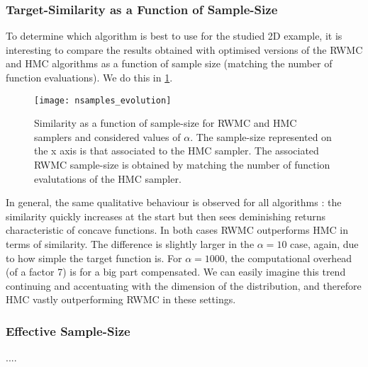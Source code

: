 \documentclass[a4paper, 12pt,oneside]{article}
\begin{document}
		\subsubsection{Target-Similarity as a Function of Sample-Size}\label{sec:target-similarity}
		To determine which algorithm is best to use for the studied 2D example, it is interesting to compare the results obtained with optimised versions of the RWMC and HMC algorithms as a function of sample size (matching the number of function evaluations). We do this in \ref{fig:nsamples-evolution}.
		\begin{figure}[htb]
			\centering
				\vspace{0em}
				\texttt{[image: nsamples\_evolution]}
				\caption{Similarity as a function of sample-size for RWMC and HMC samplers and considered values of $\alpha$. The sample-size represented on the x axis is that associated to the HMC sampler. The associated RWMC sample-size is obtained by matching the number of function evalutations of the HMC sampler.}
				\label{fig:nsamples-evolution}
		\end{figure}
		In general, the same qualitative behaviour is observed for all algorithms : the similarity quickly increases at the start but then sees deminishing returns characteristic of concave functions. In both cases RWMC outperforms HMC in terms of similarity. The difference is slightly larger in the $\alpha=10$ case, again, due to how simple the target function is. For $\alpha=1000$, the computational overhead (of a factor 7) is for a big part compensated. We can easily imagine this trend continuing and accentuating with the dimension of the distribution, and therefore HMC vastly outperforming RWMC in these settings.
		\subsubsection{Effective Sample-Size}
		....
\end{document}
